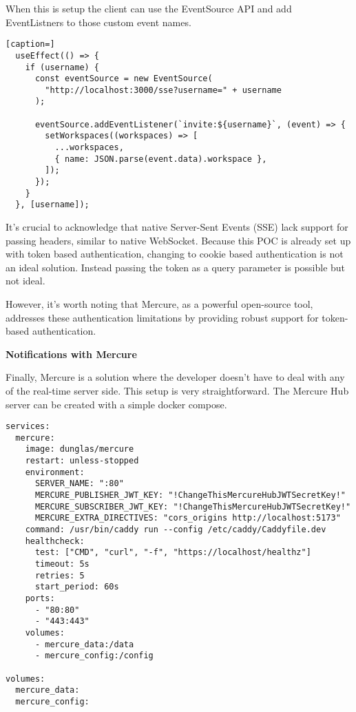 When this is setup the client can use the EventSource API and add EventListners to those custom event names.

\begin{lstlisting}[caption=]
  useEffect(() => {
    if (username) {
      const eventSource = new EventSource(
        "http://localhost:3000/sse?username=" + username
      );
 
      eventSource.addEventListener(`invite:${username}`, (event) => {
        setWorkspaces((workspaces) => [
          ...workspaces,
          { name: JSON.parse(event.data).workspace },
        ]);
      });
    }
  }, [username]);
\end{lstlisting}

It's crucial to acknowledge that native Server-Sent Events (SSE) lack support for passing headers, similar to native WebSocket. Because this POC is already set up with token based authentication, changing to cookie based authentication is not an ideal solution. Instead passing the token as a query parameter is possible but not ideal.

However, it's worth noting that Mercure, as a powerful open-source tool, addresses these authentication limitations by providing robust support for token-based authentication. 

\textbf{Notifications with Mercure}

Finally, Mercure is a solution where the developer doesn't have to deal with any of the real-time server side. This setup is very straightforward. The Mercure Hub server can be created with a simple docker compose. 

\begin{lstlisting}[caption=docker-compose.yaml for Mercure Hub]
services:
  mercure:
    image: dunglas/mercure
    restart: unless-stopped
    environment:
      SERVER_NAME: ":80"
      MERCURE_PUBLISHER_JWT_KEY: "!ChangeThisMercureHubJWTSecretKey!"
      MERCURE_SUBSCRIBER_JWT_KEY: "!ChangeThisMercureHubJWTSecretKey!"
      MERCURE_EXTRA_DIRECTIVES: "cors_origins http://localhost:5173"
    command: /usr/bin/caddy run --config /etc/caddy/Caddyfile.dev
    healthcheck:
      test: ["CMD", "curl", "-f", "https://localhost/healthz"]
      timeout: 5s
      retries: 5
      start_period: 60s
    ports:
      - "80:80"
      - "443:443"
    volumes:
      - mercure_data:/data
      - mercure_config:/config

volumes:
  mercure_data:
  mercure_config:
\end{lstlisting}

